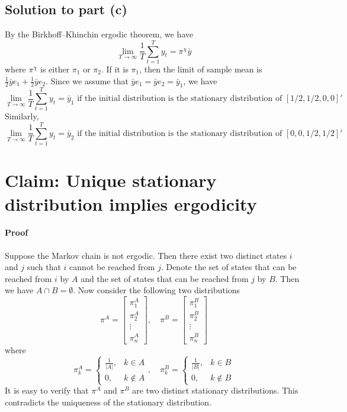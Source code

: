 \documentclass[11pt]{article}
\theoremstyle{definition}
\theoremstyle{boldtitle} %
\numberwithin{equation}{section}
\numberwithin{figure}{section}
\numberwithin{table}{section}
\begin{document}
\subsection*{Solution to part (c)}
By the Birkhoff–Khinchin ergodic theorem, we have
\[
\lim_{T \rightarrow \infty} \frac{1}{T} \sum_{t=1}^{T} y_t = \pi^{\chi} \bar{y}
\]
where $\pi^{\chi}$ is either $\pi_1$ or $\pi_2$.
If it is $\pi_1$, then the limit of sample mean is $\frac{1}{2} \bar{y} e_1 + \frac{1}{2} \bar{y} e_2$.
Since we assume that $\bar{y} e_1 = \bar{y} e_2 = \bar{y}_1$, we have 
\[
\lim_{T \rightarrow \infty} \frac{1}{T} \sum_{t=1}^{T} y_t = \bar{y}_1 \text{ if the initial distribution is the stationary distribution of } [1/2, 1/2, 0, 0]'
\]
Similarly,
\[
\lim_{T \rightarrow \infty} \frac{1}{T} \sum_{t=1}^{T} y_t = \bar{y}_2 \text{ if the initial distribution is the stationary distribution of } [0, 0, 1/2, 1/2]'
\]

\section*{Claim: Unique stationary distribution implies ergodicity}
\paragraph{Proof}
Suppose the Markov chain is not ergodic.
Then there exist two distinct states $i$ and $j$ such that $i$ cannot be reached from $j$.
Denote the set of states that can be reached from $i$ by $A$ and the set of states that can be reached from $j$ by $B$.
Then we have $A \cap B = \emptyset$.
Now consider the following two distributions
\[\pi^A = 
\left[
\begin{matrix}  
    \pi_1^A \\ \pi_2^A \\ \vdots \\ \pi_n^A
\end{matrix}
\right], \quad
\pi^B = 
\left[
\begin{matrix}  
    \pi_1^B \\ \pi_2^B \\ \vdots \\ \pi_n^B
\end{matrix}
\right]
\]
where
\[\pi_k^A = 
\begin{cases}
    \frac{1}{|A|}, & k \in A \\
    0, & k \notin A
\end{cases}, \quad
\pi_k^B = 
\begin{cases}
    \frac{1}{|B|}, & k \in B \\
    0, & k \notin B
\end{cases}
\]
It is easy to verify that $\pi^A$ and $\pi^B$ are two distinct stationary distributions.
This contradicts the uniqueness of the stationary distribution. 
\end{document}
